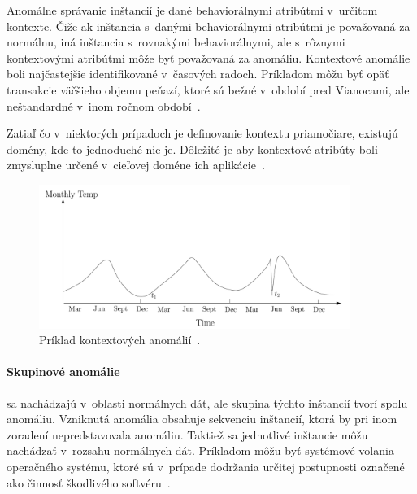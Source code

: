 \documentclass[a4paper,twoside,slovak,12pt,appendix]{article}
\begin{document}
Anomálne správanie inštancií je dané behaviorálnymi atribútmi v~určitom kontexte.
Čiže ak inštancia s~danými behaviorálnymi atribútmi je považovaná za normálnu,
iná inštancia s~rovnakými behaviorálnymi, ale s~rôznymi kontextovými atribútmi
môže byť považovaná za anomáliu. Kontextové anomálie boli najčastejšie
identifikované v~časových radoch. Príkladom môžu byť opäť transakcie väčšieho
objemu peňazí, ktoré sú bežné v~období pred Vianocami, ale neštandardné v~inom
ročnom období~\cite{Chandola2009}.

Zatiaľ čo v~niektorých prípadoch je definovanie kontextu priamočiare, existujú
domény, kde to jednoduché nie je. Dôležité je aby kontextové atribúty boli
zmysluplne určené v~cieľovej doméne ich aplikácie~\cite{Chandola2009}.

\begin{figure}[]
  \centering
  \includegraphics[width=0.9\textwidth]{contextual_anomalies.png}
  \caption{Príklad kontextových anomálií~\cite{Chandola2009}.}
  \label{fig:contextual-anomalies}
\end{figure}

\paragraph{Skupinové anomálie} sa nachádzajú v~oblasti normálnych dát, ale
skupina týchto inštancií tvorí spolu anomáliu. Vzniknutá anomália obsahuje
sekvenciu inštancií, ktorá by pri inom zoradení nepredstavovala anomáliu.
Taktiež sa jednotlivé inštancie môžu nachádzať v~rozsahu normálnych dát.
Príkladom môžu byť systémové volania operačného systému, ktoré sú v~prípade
dodržania určitej postupnosti označené ako činnosť škodlivého
softvéru~\cite{Chandola2009}.\\
\end{document}
